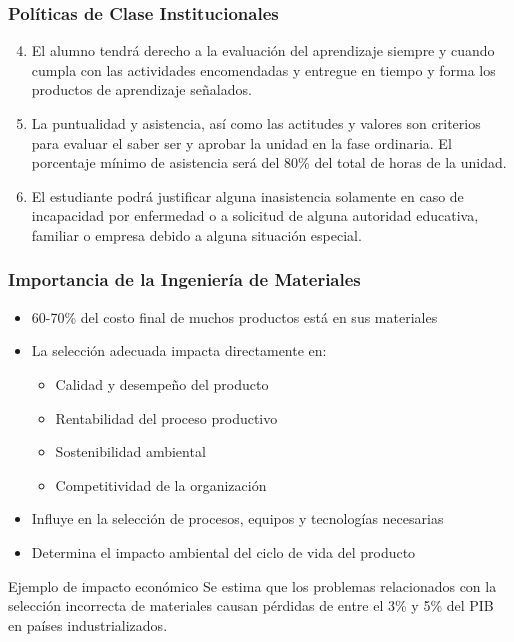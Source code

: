 \documentclass{beamer}
\begin{document}
\begin{frame}
    \frametitle{Políticas de Clase Institucionales}
    \begin{enumerate}\setcounter{enumi}{3}
        \item El alumno tendrá derecho a la evaluación del aprendizaje siempre y cuando cumpla con las actividades encomendadas y entregue en tiempo y forma los productos de aprendizaje señalados.
        
        \item La puntualidad y asistencia, así como las actitudes y valores son criterios para evaluar el saber ser y aprobar la unidad en la fase ordinaria. El porcentaje mínimo de asistencia será del 80\% del total de horas de la unidad.
        
        \item El estudiante podrá justificar alguna inasistencia solamente en caso de incapacidad por enfermedad o a solicitud de alguna autoridad educativa, familiar o empresa debido a alguna situación especial.
    \end{enumerate}
\end{frame}

\begin{frame}
    \frametitle{Importancia de la Ingeniería de Materiales}
    
    \begin{itemize}
        \item 60-70\% del costo final de muchos productos está en sus materiales
        \item La selección adecuada impacta directamente en:
        \begin{itemize}
            \item Calidad y desempeño del producto
            \item Rentabilidad del proceso productivo
            \item Sostenibilidad ambiental
            \item Competitividad de la organización
        \end{itemize}
        \item Influye en la selección de procesos, equipos y tecnologías necesarias
        \item Determina el impacto ambiental del ciclo de vida del producto
    \end{itemize}
    
    \begin{block}{Ejemplo de impacto económico}
        Se estima que los problemas relacionados con la selección incorrecta de materiales causan pérdidas de entre el 3\% y 5\% del PIB en países industrializados.
    \end{block}
\end{frame}
\end{document}
